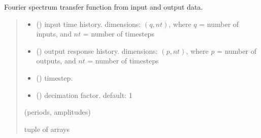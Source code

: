 \documentclass[letterpaper,10pt,english]{sphinxmanual}
\begin{document}

\begin{fulllineitems}
\label{\detokenize{library/mdof.transform:mdof.transform.fourier_transfer}}
\pysigstartsignatures
{}
\pysigstopsignatures
\sphinxAtStartPar
Fourier spectrum transfer function from input and output data.
\begin{quote}\begin{description}
\begin{itemize}
\item {} 
\sphinxAtStartPar
{} () \textendash{} input time history. dimensions: \((q,nt)\), where
\(q\) = number of inputs, and \(nt\) = number of timesteps

\item {} 
\sphinxAtStartPar
{} () \textendash{} output response history.
dimensions: \((p,nt)\), where \(p\) = number of outputs, and
\(nt\) = number of timesteps

\item {} 
\sphinxAtStartPar
{} () \textendash{} timestep.

\item {} 
\sphinxAtStartPar
{} (\sphinxstyleliteralemphasis{\sphinxupquote{, }}) \textendash{} decimation factor. default: 1

\end{itemize}

\sphinxAtStartPar
(periods, amplitudes)

\sphinxAtStartPar
tuple of arrays

\end{description}\end{quote}

\end{fulllineitems}
\end{document}
